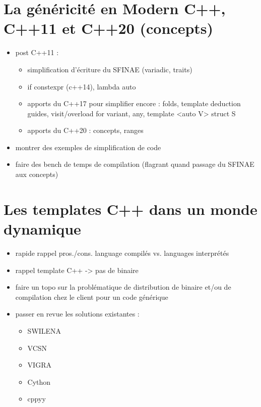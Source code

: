 \section{La généricité en Modern C++, C++11 et C++20 (concepts)}

\begin{itemize}
  \item post C++11 :
    \begin{itemize}
      \item simplification d'écriture du SFINAE (variadic, traits)
      \item if constexpr (c++14), lambda auto
      \item apports du C++17 pour simplifier encore : folds, template deduction guides, visit/overload for variant, any, template <auto V> struct S
      \item apports du C++20 : concepts, ranges
    \end{itemize}
  \item montrer des exemples de simplification de code
  \item faire des bench de temps de compilation (flagrant quand passage du SFINAE aux concepts)
\end{itemize}

\section{Les templates C++ dans un monde dynamique}

\begin{itemize}
   \item rapide rappel pros./cons. language compilés vs. languages interprétés
   \item rappel template C++ -> pas de binaire
   \item faire un topo sur la problématique de distribution de binaire et/ou de compilation chez le client pour un code générique
   \item passer en revue les solutions existantes :
     \begin{itemize}
       \item SWILENA
       \item VCSN
       \item VIGRA
       \item Cython
       \item cppyy
    \end{itemize}
\end{itemize}
